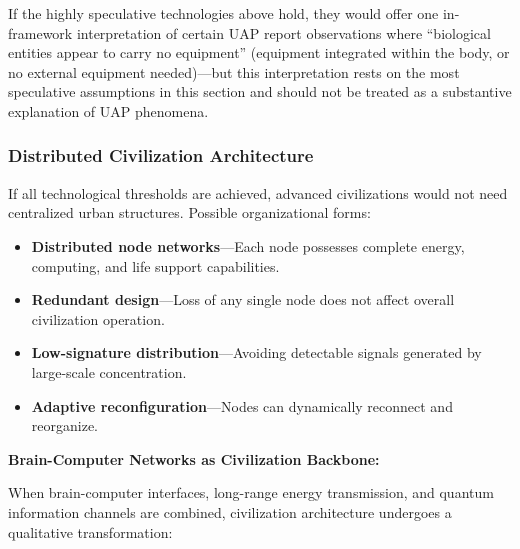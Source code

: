\documentclass[aps,prd,twocolumn,superscriptaddress,nofootinbib]{revtex4-2}
\begin{document}
If the highly speculative technologies above hold, they would offer one in-framework interpretation of certain UAP report observations where ``biological entities appear to carry no equipment'' (equipment integrated within the body, or no external equipment needed)---but this interpretation rests on the most speculative assumptions in this section and should not be treated as a substantive explanation of UAP phenomena.

\subsubsection{Distributed Civilization Architecture}\label{sec:distributed-civ}

If all technological thresholds are achieved, advanced civilizations would not need centralized urban structures. Possible organizational forms:

\begin{itemize}
  \item \textbf{Distributed node networks}---Each node possesses complete energy, computing, and life support capabilities.
  \item \textbf{Redundant design}---Loss of any single node does not affect overall civilization operation.
  \item \textbf{Low-signature distribution}---Avoiding detectable signals generated by large-scale concentration.
  \item \textbf{Adaptive reconfiguration}---Nodes can dynamically reconnect and reorganize.
\end{itemize}

\textbf{Brain-Computer Networks as Civilization Backbone:}

When brain-computer interfaces, long-range energy transmission, and quantum information channels are combined, civilization architecture undergoes a qualitative transformation:
\end{document}
